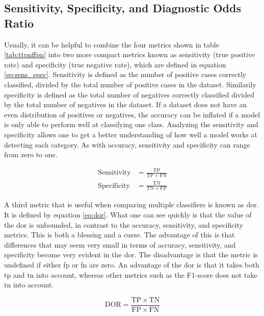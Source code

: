\subsection{Sensitivity, Specificity, and Diagnostic Odds Ratio}
Usually, it can be helpful to combine the four metrics shown in table \ref{tab:ttpnffpn} into two more compact metrics known as sensitivity (true positive rate) and specificity (true negative rate), which are defined in equation \eqref{eq:sens_spec}. Sensitivity is defined as the number of positive cases correctly classified, divided by the total number of positive cases in the dataset. Similarily specificity is defined as the total number of negatives correctly classified divided by the total number of negatives in the dataset. If a dataset does not have an even distribution of positives or negatives, the accuracy can be inflated if a model is only able to perform well at classifying one class. Analyzing the sensitivity and specificity allows one to get a better understanding of how well a model works at detecting each category. As with accuracy, sensitivity and specificity can range from zero to one.

\begin{equation}
    \begin{split}
        \mathrm{Sensitivity} &= \frac{\mathrm{TP}}{\mathrm{TP} + \mathrm{FN}} \\
        \mathrm{Specificity} &= \frac{\mathrm{TN}}{\mathrm{TN} + \mathrm{FP}}
    \end{split}
    \label{eq:sens_spec}
\end{equation}

A third metric that is useful when comparing multiple classifiers is known as \acrfull{dor}. It is defined by equation \eqref{eq:dor}. What one can see quickly is that the value of the \acrshort{dor} is unbounded, in contrast to the accuracy, sensitivity, and specificity metrics. This is both a blessing and a curse. The advantage of this is that differences that may seem very small in terms of accuracy, sensitivity, and specificity become very evident in the \acrshort{dor}. The disadvantage is that the metric is undefined if either \acrshort{fp} or \acrshort{fn} are zero. An advantage of the \acrshort{dor} is that it takes both \acrshort{tp} and \acrshort{tn} into account, whereas other metrics such as the F1-score does not take \acrshort{tn} into account. 

\begin{equation}
    \mathrm{DOR} = \frac{\mathrm{TP}\times\mathrm{TN}}{\mathrm{FP}\times\mathrm{FN}}
    \label{eq:dor}
\end{equation}

